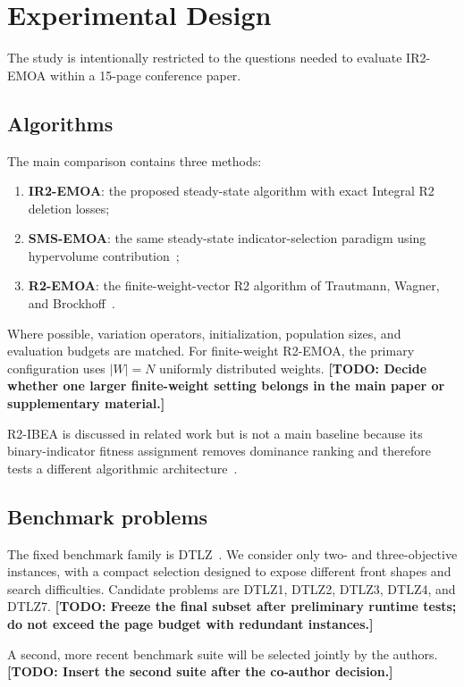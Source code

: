 \documentclass[runningheads]{llncs}
\newcommand{\todo}[1]{\textcolor{red!70!black}{\textbf{[TODO: #1]}}}
\begin{document}
\section{Experimental Design}
\label{sec:experiments}

The study is intentionally restricted to the questions needed to evaluate IR2-EMOA within a 15-page conference paper.

\subsection{Algorithms}

The main comparison contains three methods:
\begin{enumerate}
    \item \textbf{IR2-EMOA}: the proposed steady-state algorithm with exact Integral R2 deletion losses;
    \item \textbf{SMS-EMOA}: the same steady-state indicator-selection paradigm using hypervolume contribution~\cite{BeumeNaujoksEmmerich2007};
    \item \textbf{R2-EMOA}: the finite-weight-vector R2 algorithm of Trautmann, Wagner, and Brockhoff~\cite{TrautmannWagnerBrockhoff2013}.
\end{enumerate}
Where possible, variation operators, initialization, population sizes, and evaluation budgets are matched. For finite-weight R2-EMOA, the primary configuration uses $|W|=N$ uniformly distributed weights. \todo{Decide whether one larger finite-weight setting belongs in the main paper or supplementary material.}

R2-IBEA is discussed in related work but is not a main baseline because its binary-indicator fitness assignment removes dominance ranking and therefore tests a different algorithmic architecture~\cite{PhanSuzuki2013}.

\subsection{Benchmark problems}

The fixed benchmark family is DTLZ~\cite{DebThieleLaumannsZitzler2002}. We consider only two- and three-objective instances, with a compact selection designed to expose different front shapes and search difficulties. Candidate problems are DTLZ1, DTLZ2, DTLZ3, DTLZ4, and DTLZ7. \todo{Freeze the final subset after preliminary runtime tests; do not exceed the page budget with redundant instances.}

A second, more recent benchmark suite will be selected jointly by the authors. \todo{Insert the second suite after the co-author decision.}
\end{document}
